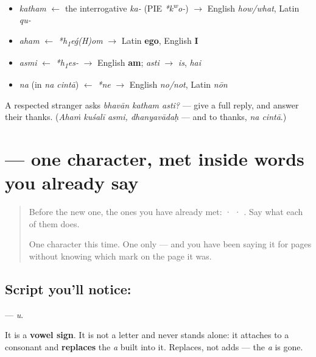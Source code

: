 \begin{grammarlens}[title={What you've built: the roots you now carry}]
\begin{itemize}
\raggedright
  \item \emph{katham} $\leftarrow$ the interrogative \emph{ka-} (PIE \emph{*k\textsuperscript{w}o-}) $\to$ English \emph{how/what}, Latin \emph{qu-}
  \item \emph{aham} $\leftarrow$ \emph{*h\textsubscript{1}eǵ(H)om} $\to$ Latin \textbf{ego}, English \textbf{I}
  \item \emph{asmi} $\leftarrow$ \emph{*h\textsubscript{1}es-} $\to$ English \textbf{am}; \emph{asti} $\to$ \emph{is}, \emph{hai}
  \item \emph{na} (in \emph{na cintā}) $\leftarrow$ \emph{*ne} $\to$ English \emph{no/not}, Latin \emph{nōn}
\end{itemize}
\end{grammarlens}

\begin{tcolorbox}[breakable,colback=teal!4,colframe=teal!35!black,title={Before you move on}]
A respected stranger asks \emph{bhavān katham asti?} — give a full reply, and answer their thanks. (\emph{Ahaṁ kuśalī asmi, dhanyavādaḥ} — and to thanks, \emph{na cintā}.)
\end{tcolorbox}
\section[\texorpdfstring{\sk{ु} (u)}{ु (u)}]{ — one character, met inside words you already say}

\label{lesson:SA-S203-vowel-sign-u}



\begin{quote}
Before the new one, the ones you have already met:  ·  · . Say what each of them does.

One character this time. One only — and you have been saying it for pages without knowing which mark on the page it was.
\end{quote}

\subsection*{Script you'll notice: }
\textbf{} — \emph{u}.

It is a \textbf{vowel sign}. It is not a letter and never stands alone: it attaches to a consonant and \textbf{replaces} the \emph{a} built into it. Replaces, not adds — the \emph{a} is gone.

